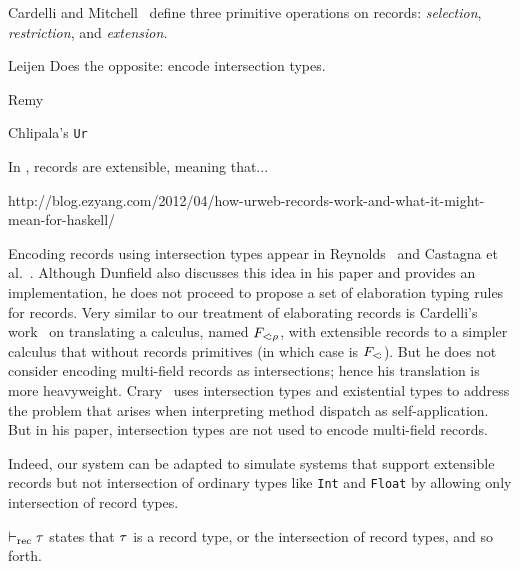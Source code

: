 Cardelli and
Mitchell~\cite{cardelli1990operations} define three primitive operations on
records: \emph{selection}, \emph{restriction}, and \emph{extension}.

Leijen
Does the opposite: encode intersection types.
\cite{leijen2004first}

Remy~\cite{remy1993type}



Chlipala's \texttt{Ur}~\cite{chlipala2010ur}

In \Name, records are extensible, meaning that...

http://blog.ezyang.com/2012/04/how-urweb-records-work-and-what-it-might-mean-for-haskell/

\cite{harper1991record}


Encoding records using intersection types appear in
Reynolds~\cite{reynolds1997design} and Castagna et
al.~\cite{castagna1995calculus}. Although Dunfield also discusses this idea in
his paper \cite{dunfield2014elaborating} and provides an implementation, he does
not proceed to propose a set of elaboration typing rules for records. Very
similar to our treatment of elaborating records is Cardelli's
work~\cite{cardelli1992extensible} on translating a calculus, named
$ F_{<\!: \rho}$, with extensible records to a simpler calculus that without
records primitives (in which case is $ F_{<\!:} $). But he does not consider
encoding multi-field records as intersections; hence his translation is more
heavyweight. Crary~\cite{crary1998simple} uses intersection types and
existential types to address the problem that arises when interpreting method
dispatch as self-application. But in his paper, intersection types are not used
to encode multi-field records.


%

Indeed, our system can be adapted to simulate systems that support extensible
records but not intersection of ordinary types like \texttt{Int} and
\texttt{Float} by allowing only intersection of record types.

$ \vdash_{\textrm{rec}} \tau $ states that $ \tau $ is a record type, or the intersection of
record types, and so forth.


